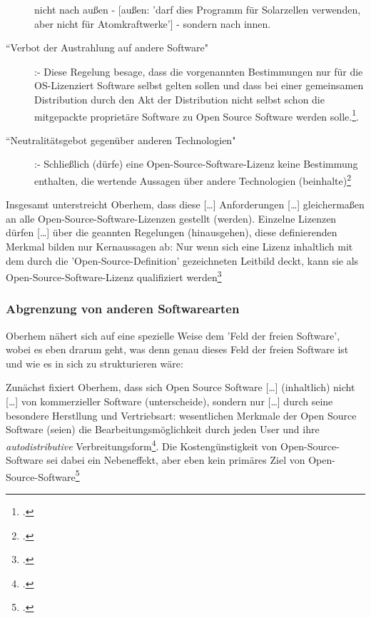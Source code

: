 \documentclass[DIV=calc,BCOR=5mm,11pt,headings=small,oneside,abstract=true, toc=bib]{scrartcl}
\begin{document}
\begin{description}
  nicht nach außen - [außen: 'darf dies Programm für Solarzellen verwenden, aber
  nicht für Atomkraftwerke'] - sondern nach innen.
  \item[``Verbot der Austrahlung auf andere Software"] :- Diese
  Regelung besage, dass die vorgenannten Bestimmungen nur für die OS-Lizenziert
  Software selbst gelten sollen und dass bei einer gemeinsamen Distribution
  durch den Akt der Distribution nicht selbst schon die mitgepackte proprietäre
  Software zu Open Source Software werden
  solle.\footcite[vgl.][16]{Oberhem2008a}.
  \item[``Neutralitätsgebot gegenüber anderen Technologien"] :-
  \glqq{}Schließlich (dürfe) eine Open-Source-Software-Lizenz keine
  Bestimmung enthalten, die wertende Aussagen über andere Technologien
  (beinhalte)\grqq{}\footcite[vgl.][17]{Oberhem2008a}
\end{description}

Insgesamt unterstreicht Oberhem, dass diese \glqq{}[\ldots] Anforderungen
[\ldots] gleichermaßen an alle Open-Source-Software-Lizenzen gestellt
(werden)\grqq{}. Einzelne Lizenzen dürfen \glqq{}[\ldots] über die
geannten Regelungen (hinausgehen)\grqq{}, diese definierenden Merkmal bilden nur
\glqq{}Kernaussagen\grqq{} ab: \glqq{}Nur wenn sich eine Lizenz
inhaltlich mit dem durch die 'Open-Source-Definition' gezeichneten
Leitbild deckt, kann sie als Open-Source-Software-Lizenz qualifiziert
werden\grqq{}\grqq{}\footcite[vgl.][17]{Oberhem2008a}

\subsubsection{Abgrenzung von anderen Softwarearten}

Oberhem nähert sich auf eine spezielle Weise dem 'Feld der freien Software',
wobei es eben drarum geht, was denn genau dieses Feld der freien Software ist
und wie es in sich zu strukturieren wäre:

Zunächst fixiert Oberhem, dass sich Open Source Software \glqq{}[\ldots]
(inhaltlich) nicht [\ldots] von kommerzieller Software (unterscheide)\grqq{},
sondern nur \glqq{}[\ldots] durch seine besondere Herstllung und
Vertriebsart\grqq{}: \glqq{}wesentlichen Merkmale der Open Source Software
(seien) die Bearbeitungsmöglichkeit durch jeden User und ihre
\textit{autodistributive} Verbreitungsform\grqq{}\footcite[vgl.][8 herv.
KR.]{Oberhem2008a}. Die \glqq{}Kostengünstigkeit\grqq{} von Open-Source-Software
sei dabei ein \glqq{}Nebeneffekt\grqq{}, aber eben \glqq{}kein primäres
Ziel von Open-Source-Software\grqq{}\footcite[vgl.][8]{Oberhem2008a}
\end{document}
